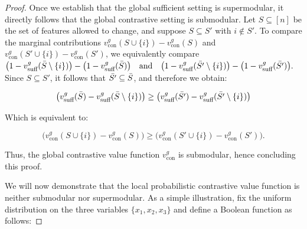 \documentclass{article}
\begin{document}
\begin{proof}

Once we establish that the global sufficient setting is supermodular, it directly follows that the global contrastive setting is submodular. Let $S \subseteq [n]$ be the set of features allowed to change, and suppose $S \subseteq S'$ with $i \notin S'$. To compare the marginal contributions $v^g_{\text{con}}(S \cup \{i\}) - v^g_{\text{con}}(S)$ and $v^g_{\text{con}}(S' \cup \{i\}) - v^g_{\text{con}}(S')$, we equivalently compare
$\bigl(1 - v^g_{\text{suff}}(\Bar{S} \setminus \{i\})\bigr) - \bigl(1 - v^g_{\text{suff}}(\Bar{S})\bigr) \quad \text{and} \quad \bigl(1 - v^g_{\text{suff}}(\Bar{S'} \setminus \{i\})\bigr) - \bigl(1 - v^g_{\text{suff}}(\Bar{S'})\bigr).$
Since $S \subseteq S'$, it follows that $\Bar{S'} \subseteq \Bar{S}$, and therefore we obtain:



\begin{equation}
\bigl(v^g_{\text{suff}}(\Bar{S}) - v^g_{\text{suff}}(\Bar{S} \setminus\{i\})\bigr) \geq
\bigl(v^g_{\text{suff}}(\Bar{S'}) - v^g_{\text{suff}}(\Bar{S'} \setminus\{i\})\bigr)
\end{equation}

Which is equivalent to:

\begin{equation}
\bigl(v^g_{\text{con}}(S\cup\{i\}) - v^g_{\text{con}}(S)\bigr) \geq
\bigl(v^g_{\text{con}}(S'\cup\{i\}) - v^g_{\text{con}}(S')\bigr).
\end{equation}

Thus, the global contrastive value function $v^g_{\text{con}}$ is submodular, hence concluding this proof.


We will now demonstrate that the local probabilistic contrastive value function is neither submodular nor supermodular. As a simple illustration, fix the uniform distribution on the three variables $\{x_1, x_2, x_3\}$
and define a Boolean function as follows:


\end{proof}
\end{document}
